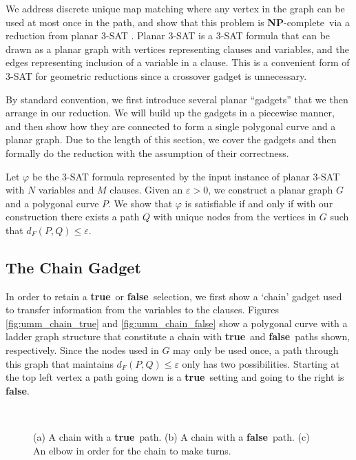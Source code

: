 \documentclass{article}[11pt]
\newcommand{\dfre}{d_F}
\newcommand{\npc}{\textbf{NP}-complete}
\newcommand{\true}{\textbf{true}}
\newcommand{\false}{\textbf{false}}
\begin{document}
We address discrete unique map matching where any vertex in the graph can be used
at most once in the path, and show that this problem is \npc\ 
via a reduction from planar 3-SAT \cite{Lichtenstein:1982:SIAM}. Planar 3-SAT is
a 3-SAT formula that can be drawn as a planar graph with vertices representing clauses
and variables, and the edges representing inclusion of a variable in a clause.  
This is a convenient form of 3-SAT for geometric reductions since 
a crossover gadget is unnecessary.

By standard convention, we first introduce several
planar ``gadgets'' that we then arrange in our reduction.  We will build up the gadgets in
a piecewise manner, and then show how they are connected to form a single polygonal curve and a planar graph.
Due to the length of this section, we cover the gadgets and then formally do the
reduction with the assumption of their correctness.
  
Let $\varphi$ be the 3-SAT formula represented by the input instance of planar 3-SAT with $N$ variables 
and $M$ clauses. 
Given an $\varepsilon > 0$, we construct a planar graph $G$ and a polygonal curve $P$.
We show that $\varphi$ is satisfiable if and only if with our construction there exists a path 
$Q$ with unique nodes from the vertices in $G$ such that $\dfre(P,Q) \leq \varepsilon$.





\subsection{The Chain Gadget}
In order to retain a \true\ or \false\ selection, we first show a `chain' gadget used to transfer information
from the variables to the clauses. 
Figures \ref{fig:umm_chain_true} and \ref{fig:umm_chain_false} show a polygonal curve with a ladder graph structure
that constitute a chain with \true\ and \false\ paths shown, respectively.  
Since the nodes used in $G$ may only be used once, a path through this graph that maintains
$\dfre(P,Q) \leq \varepsilon$ only has two possibilities.  Starting at the top
left vertex a path going down is a \true\ setting and going to the right is \false.



\begin{figure}[ht!]
\begin{center}
        \hspace*{.2cm}
        \hspace*{.2cm}
         \\
    \end{center}
\caption{(a) A chain with a \true\ path. (b) A chain with a \false\ path. (c) An elbow in order for the chain to make turns.}
    \label{fig:umm_temp}
\end{figure} 
\end{document}

